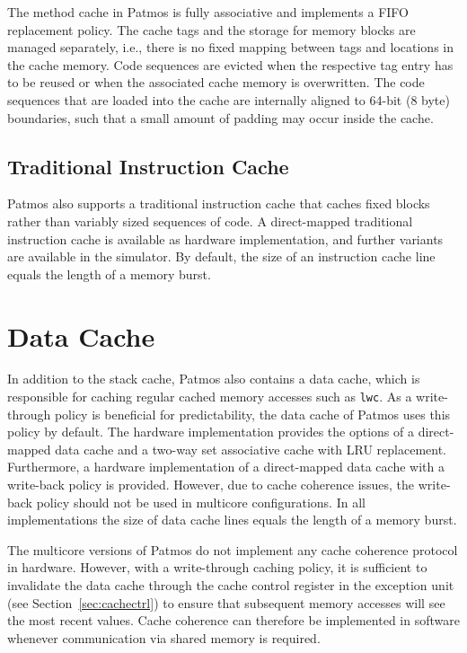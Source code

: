 \documentclass[a4paper,fontsize=10pt,twoside,DIV15,BCOR12mm,headinclude=true,footinclude=false,pagesize,bibtotoc]{scrbook}
\newcommand{\code}[1]{{\texttt{#1}}}
\begin{document}
The method cache in Patmos is fully associative and implements a FIFO
replacement policy. The cache tags and the storage for memory blocks
are managed separately, i.e., there is no fixed mapping between tags
and locations in the cache memory. Code sequences are evicted when the
respective tag entry has to be reused or when the associated cache
memory is overwritten. The code sequences that are loaded into the
cache are internally aligned to 64-bit (8 byte) boundaries, such that
a small amount of padding may occur inside the cache.

\subsection{Traditional Instruction Cache}
\label{sec:line-cache}

Patmos also supports a traditional instruction cache that caches fixed
blocks rather than variably sized sequences of code. A direct-mapped
traditional instruction cache is available as hardware implementation,
and further variants are available in the simulator. By default, the
size of an instruction cache line equals the length of a memory burst.

\section{Data Cache}

In addition to the stack cache, Patmos also contains a data cache,
which is responsible for caching regular cached memory accesses such
as \code{lwc}. As a write-through policy is beneficial for
predictability, the data cache of Patmos uses this policy by
default. The hardware implementation provides the options of a
direct-mapped data cache and a two-way set associative cache with LRU
replacement. Furthermore, a hardware implementation of a direct-mapped
data cache with a write-back policy is provided. However, due to cache
coherence issues, the write-back policy should not be used in
multicore configurations. In all implementations the size of
data cache lines equals the length of a memory burst.

The multicore versions of Patmos do not implement any cache coherence
protocol in hardware. However, with a write-through caching policy, it
is sufficient to invalidate the data cache through the cache control
register in the exception unit (see Section~\ref{sec:cachectrl}) to
ensure that subsequent memory accesses will see the most recent
values. Cache coherence can therefore be implemented in software
whenever communication via shared memory is required.
\end{document}
